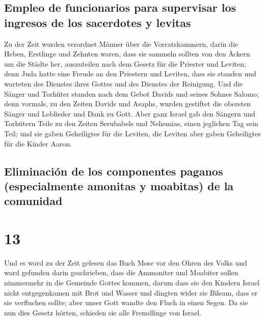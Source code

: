\hypertarget{empleo-de-funcionarios-para-supervisar-los-ingresos-de-los-sacerdotes-y-levitas}{%
\subsection{Empleo de funcionarios para supervisar los ingresos de los
sacerdotes y
levitas}\label{empleo-de-funcionarios-para-supervisar-los-ingresos-de-los-sacerdotes-y-levitas}}

 Zu der Zeit wurden verordnet Männer über die
Vorratskammern, darin die Heben, Erstlinge und Zehnten waren, dass sie
sammeln sollten von den Äckern um die Städte her, auszuteilen nach dem
Gesetz für die Priester und Leviten; denn Juda hatte eine Freude an den
Priestern und Leviten, dass sie standen  und warteten des
Dienstes ihres Gottes und des Dienstes der Reinigung. Und die Sänger und
Torhüter standen nach dem Gebot Davids und seines Sohnes Salomo;
 denn vormals, zu den Zeiten Davids und Asaphs, wurden
gestiftet die obersten Sänger und Loblieder und Dank zu Gott.
 Aber ganz Israel gab den Sängern und Torhütern Teile zu
den Zeiten Serubabels und Nehemias, einen jeglichen Tag sein Teil; und
sie gaben Geheiligtes für die Leviten, die Leviten aber gaben
Geheiligtes für die Kinder Aaron.

\hypertarget{eliminaciuxf3n-de-los-componentes-paganos-especialmente-amonitas-y-moabitas-de-la-comunidad}{%
\subsection{Eliminación de los componentes paganos (especialmente
amonitas y moabitas) de la
comunidad}\label{eliminaciuxf3n-de-los-componentes-paganos-especialmente-amonitas-y-moabitas-de-la-comunidad}}

\hypertarget{section-12}{%
\section{13}\label{section-12}}

 Und es ward zu der Zeit gelesen das Buch Mose vor den
Ohren des Volks und ward gefunden darin geschrieben, dass die Ammoniter
und Moabiter sollen nimmermehr in die Gemeinde Gottes kommen,
 darum dass sie den Kindern Israel nicht entgegenkamen mit
Brot und Wasser und dingten wider sie Bileam, dass er sie verfluchen
sollte; aber unser Gott wandte den Fluch in einen Segen. 
Da sie nun dies Gesetz hörten, schieden sie alle Fremdlinge von Israel.


